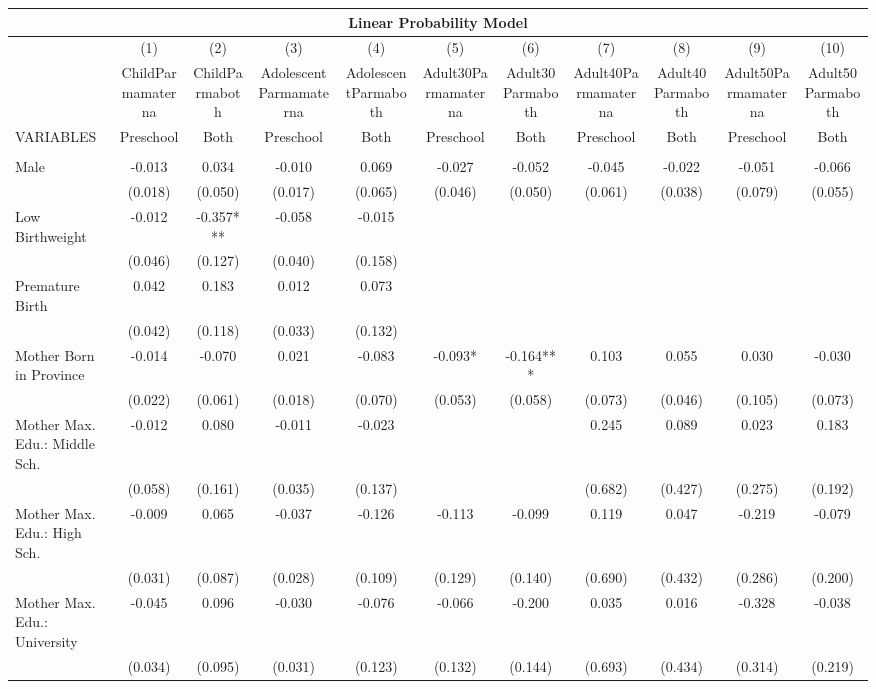 \begin{tabular}{lcccccccccc}
\multicolumn{11}{c}{Linear Probability Model} \\ \hline
 & (1) & (2) & (3) & (4) & (5) & (6) & (7) & (8) & (9) & (10) \\
 & ChildParmamaterna & ChildParmaboth & AdolescentParmamaterna & AdolescentParmaboth & Adult30Parmamaterna & Adult30Parmaboth & Adult40Parmamaterna & Adult40Parmaboth & Adult50Parmamaterna & Adult50Parmaboth \\
VARIABLES & Preschool & Both & Preschool & Both & Preschool & Both & Preschool & Both & Preschool & Both \\ \hline
 &  &  &  &  &  &  &  &  &  &  \\
Male & -0.013 & 0.034 & -0.010 & 0.069 & -0.027 & -0.052 & -0.045 & -0.022 & -0.051 & -0.066 \\
 & (0.018) & (0.050) & (0.017) & (0.065) & (0.046) & (0.050) & (0.061) & (0.038) & (0.079) & (0.055) \\
Low Birthweight & -0.012 & -0.357*** & -0.058 & -0.015 &  &  &  &  &  &  \\
 & (0.046) & (0.127) & (0.040) & (0.158) &  &  &  &  &  &  \\
Premature Birth & 0.042 & 0.183 & 0.012 & 0.073 &  &  &  &  &  &  \\
 & (0.042) & (0.118) & (0.033) & (0.132) &  &  &  &  &  &  \\
Mother Born in Province & -0.014 & -0.070 & 0.021 & -0.083 & -0.093* & -0.164*** & 0.103 & 0.055 & 0.030 & -0.030 \\
 & (0.022) & (0.061) & (0.018) & (0.070) & (0.053) & (0.058) & (0.073) & (0.046) & (0.105) & (0.073) \\
Mother Max. Edu.: Middle Sch. & -0.012 & 0.080 & -0.011 & -0.023 &  &  & 0.245 & 0.089 & 0.023 & 0.183 \\
 & (0.058) & (0.161) & (0.035) & (0.137) &  &  & (0.682) & (0.427) & (0.275) & (0.192) \\
Mother Max. Edu.: High Sch. & -0.009 & 0.065 & -0.037 & -0.126 & -0.113 & -0.099 & 0.119 & 0.047 & -0.219 & -0.079 \\
 & (0.031) & (0.087) & (0.028) & (0.109) & (0.129) & (0.140) & (0.690) & (0.432) & (0.286) & (0.200) \\
Mother Max. Edu.: University & -0.045 & 0.096 & -0.030 & -0.076 & -0.066 & -0.200 & 0.035 & 0.016 & -0.328 & -0.038 \\
 & (0.034) & (0.095) & (0.031) & (0.123) & (0.132) & (0.144) & (0.693) & (0.434) & (0.314) & (0.219) \\

\end{tabular}
